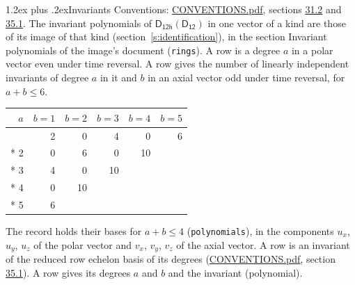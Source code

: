 \documentclass[10pt,a4paper]{article}
\makeatletter
\renewcommand\section{\@startsection{section}{1}{\z@}{-3ex plus -1ex minus -.2ex}%
  {1.2ex plus .2ex}{\normalfont\large\sffamily\bfseries\color{parttitle}}}
\numberwithin{equation}{section}
\newcommand{\grp}[1]{\mathsf{#1}}
\makeatother
\begin{document}
\section{Invariants}\label{s:invariants}
Conventions: \href{../../CONVENTIONS.pdf}{CONVENTIONS.pdf}, sections \href{../../CONVENTIONS.pdf\#conv.31.2}{31.2} and \href{../../CONVENTIONS.pdf\#conv.35.1}{35.1}.
The invariant polynomials of $\grp{D_{12h}}(\grp{D_{12}})$ in one vector of a kind are those of its image of that kind (section~\ref{s:identification}), in the section Invariant polynomials of the image's document (\texttt{rings}).
\leavevmode\label{n:index.degree.polar}\label{n:index.degree.axial}A row is a degree $a$ in a polar vector even under time reversal. A row gives the number of linearly independent invariants of degree $a$ in it and $b$ in an axial vector odd under time reversal, for $a + b \le 6$.
{\small\begin{longtable}{@{}rrrrrr@{}}\toprule
$a$ & $b = 1$ & $b = 2$ & $b = 3$ & $b = 4$ & $b = 5$\\\midrule\endhead
\bottomrule\endfoot\endlastfoot
1 & 2 & 0 & 4 & 0 & 6\\*
2 & 0 & 6 & 0 & 10 & \\*
3 & 4 & 0 & 10 &  & \\*
4 & 0 & 10 &  &  & \\*
5 & 6 &  &  &  & \\
\bottomrule\end{longtable}}
\leavevmode\label{n:local.component.polar}\label{n:local.component.axial}The record holds their bases for $a + b \le 4$ (\texttt{polynomials}), in the components $u_{x}$, $u_{y}$, $u_{z}$ of the polar vector and $v_{x}$, $v_{y}$, $v_{z}$ of the axial vector. \label{n:head.polynomial}A row is an invariant of the reduced row echelon basis of its degrees (\href{../../CONVENTIONS.pdf}{CONVENTIONS.pdf}, section \href{../../CONVENTIONS.pdf\#conv.35.1}{35.1}). A row gives its degrees $a$ and $b$ and the invariant (polynomial).
\end{document}
